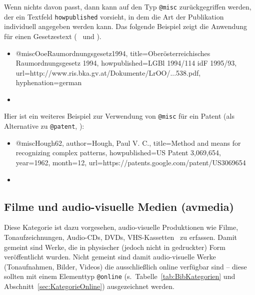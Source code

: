 Wenn nichts davon passt, dann kann auf den Typ \texttt{@misc} zurückgegriffen werden, der ein
Textfeld \texttt{howpublished} vorsieht, in dem die Art der Publikation individuell 
angegeben werden kann. Das folgende Beispiel zeigt die Anwendung für einen Gesetzestext 
(\sa\ \cite{FhStG1993} und \cite{EuRichtlinie2000}).
%
\begin{itemize}
\item[]
\begin{GenericCode}[numbers=none]
@misc{OoeRaumordnungsgesetz1994,
  title={Oberösterreichisches Raumordnungsgesetz 1994},
  howpublished={LGBl 1994/114 idF 1995/93},
  url={http://www.ris.bka.gv.at/Dokumente/LrOO/...538.pdf},
  hyphenation={german}
}
\end{GenericCode}
\item[\cite{OoeRaumordnungsgesetz1994}] 
\end{itemize}
%
Hier ist ein weiteres Beispiel zur Verwendung von \texttt{@misc} für ein Patent (als Alternative zu \texttt{@patent}, \so):
%
\begin{itemize}
\item[]
\begin{GenericCode}[numbers=none]
@misc{Hough62,
	author={Hough, Paul V. C.},
	title={Method and means for recognizing complex patterns},
	howpublished={US Patent 3,069,654},
	year={1962},
	month={12},
	url={https://patents.google.com/patent/US3069654}
}
\end{GenericCode}
\item[\cite{Hough62}] 
\end{itemize}





\subsection{Filme und audio-visuelle Medien (\textsf{avmedia})}
\label{sec:KategorieAvmedia}
Diese Kategorie ist dazu vorgesehen, audio-visuelle Produktionen wie Filme, 
Tonaufzeichnungen, Audio-CDs, DVDs, VHS-Kassetten \usw\ zu erfassen.
Damit gemeint sind Werke, die in physischer (jedoch nicht in gedruckter) Form
veröffentlicht wurden.
Nicht gemeint sind damit audio-visuelle Werke (Tonaufnahmen, Bilder, Videos) 
die ausschließlich online verfügbar sind -- diese sollten mit einem Elementtyp 
\texttt{@online} (s.\ Tabelle~\ref{tab:BibKategorien} und Abschnitt~\ref{sec:KategorieOnline}) ausgezeichnet werden.

